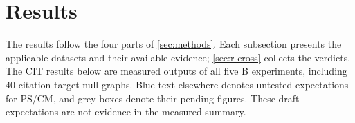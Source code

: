 \section{Results}
\label{sec:results}
The results follow the four parts of \cref{sec:methods}. Each subsection presents
the applicable datasets and their available evidence;
\cref{sec:r-cross} collects the verdicts. The CIT results below are measured outputs of all five B experiments, including
40 citation-target null graphs. Blue text elsewhere denotes untested expectations
for PS/CM, and grey boxes denote their pending figures. These draft expectations
are not evidence in the measured summary.


\FloatBarrier
